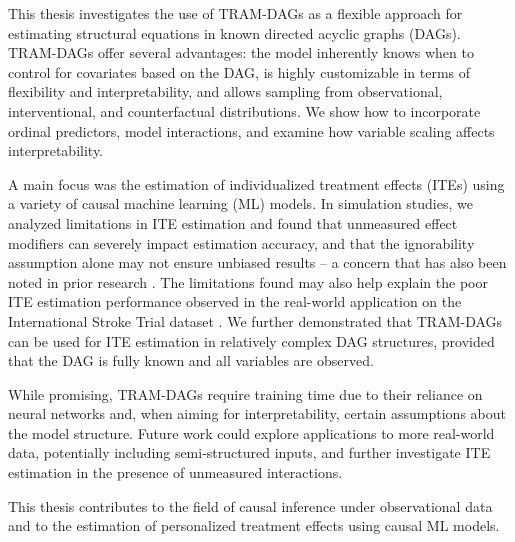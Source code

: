 \documentclass[11pt,a4paper,twoside]{book}
\begin{document}
This thesis investigates the use of TRAM-DAGs \citep{sick2025} as a flexible approach for estimating structural equations in known directed acyclic graphs (DAGs). TRAM-DAGs offer several advantages: the model inherently knows when to control for covariates based on the DAG, is highly customizable in terms of flexibility and interpretability, and allows sampling from observational, interventional, and counterfactual distributions. We show how to incorporate ordinal predictors, model interactions, and examine how variable scaling affects interpretability.

A main focus was the estimation of individualized treatment effects (ITEs) using a variety of causal machine learning (ML) models. In simulation studies, we analyzed limitations in ITE estimation and found that unmeasured effect modifiers can severely impact estimation accuracy, and that the ignorability assumption alone may not ensure unbiased results -- a concern that has also been noted in prior research \citep{vegetabile2021}. The limitations found may also help explain the poor ITE estimation performance observed in the real-world application on the International Stroke Trial dataset \citep{chen2025}. We further demonstrated that TRAM-DAGs can be used for ITE estimation in relatively complex DAG structures, provided that the DAG is fully known and all variables are observed.

While promising, TRAM-DAGs require training time due to their reliance on neural networks and, when aiming for interpretability, certain assumptions about the model structure. Future work could explore applications to more real-world data, potentially including semi-structured inputs, and further investigate ITE estimation in the presence of unmeasured interactions.

This thesis contributes to the field of causal inference under observational data and to the estimation of personalized treatment effects using causal ML models.
\end{document}
